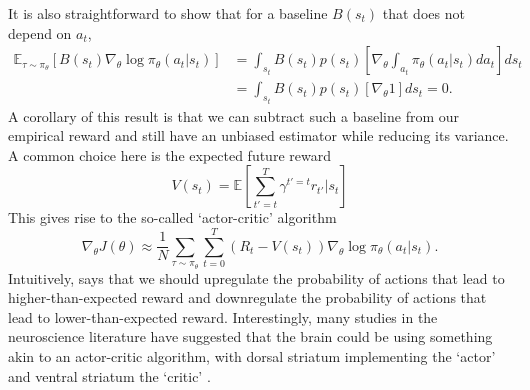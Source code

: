 It is also straightforward to show that for a baseline $B(s_t)$ that does not depend on $a_t$,
\begin{align}
    \mathbb{E}_{\tau \sim \pi_\theta} \left [ B(s_t) \nabla_\theta \log \pi_\theta (a_t|s_t) \right ]
     & = \int_{s_t} B(s_t) p(s_t) \left [ \nabla_\theta \int_{a_t} \pi_\theta (a_t|s_t) da_t \right ] ds_t \\
     & = \int_{s_t} B(s_t) p(s_t) \left [ \nabla_\theta 1 \right ] ds_t = 0.
\end{align}
A corollary of this result is that we can subtract such a baseline from our empirical reward and still have an unbiased estimator while reducing its variance.
A common choice here is the expected future reward
\begin{equation}
    V(s_t) = \mathbb{E} \left [ \sum_{t' = t}^T \gamma^{t'=t} r_{t'} | s_t \right ]
\end{equation}
This gives rise to the so-called `actor-critic' algorithm
\begin{equation}
    \label{eq:AC}
    \nabla_\theta J(\theta) \approx \frac{1}{N} \sum_{\tau \sim \pi_\theta}  \sum_{t=0}^T (R_t - V(s_t)) \nabla_\theta \log \pi_\theta (a_t|s_t).
\end{equation}
Intuitively,  says that we should upregulate the probability of actions that lead to higher-than-expected reward and downregulate the probability of actions that lead to lower-than-expected reward.
Interestingly, many studies in the neuroscience literature have suggested that the brain could be using something akin to an actor-critic algorithm, with dorsal striatum implementing the `actor' and ventral striatum the `critic' \citep{takahashi2008silencing,sutton2018reinforcement}.

